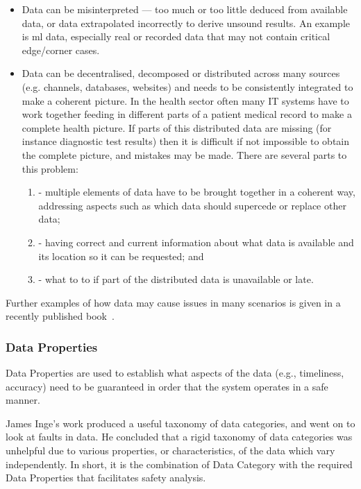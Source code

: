 \begin{itemize}
  \item {} Data can be misinterpreted --- too much or too little deduced from available data, or data extrapolated incorrectly to derive unsound results.
    An example is \gls{ml} data, especially real or recorded data that may not contain critical edge/corner cases.

  \item {}
    Data can be decentralised, decomposed or distributed across many sources (e.g. channels, \glspl{database}, websites) and needs to be consistently integrated to make a coherent picture. In the health sector often many IT systems have to work together feeding in different parts of a patient medical record to make a complete health picture. If parts of this distributed data are missing (for instance diagnostic test results) then it is difficult if not impossible to obtain the complete picture, and mistakes may be made.
    There are several parts to this problem:
    \begin{enumerate}[label=\alph*]
    	\item {} - multiple elements of data have to be brought together in a coherent way, addressing aspects such as which data should supercede or replace other data;
    	\item {} - having correct and current information about what data is available and its location so it can be requested; and
    	\item {} - what to to if part of the distributed data is unavailable or late.
    \end{enumerate}
\end{itemize}


Further examples of how data may cause issues in many scenarios is given in a recently published book~\cite{citation:datacentric}.

\subsubsection{Data Properties}\label{bkm:guidance:dataproperties}
Data Properties are used to establish what aspects of the data (e.g., timeliness, \gls{accuracy}) need to be guaranteed in order that the system operates in a safe manner.

James Inge's work \cite{citation:inge2008improving} produced a useful taxonomy of data categories, and went on to look at faults in data. He concluded that a rigid taxonomy of data categories was unhelpful due to various properties, or characteristics, of the data which vary independently. In short, it is the combination of Data Category with the required Data Properties that facilitates safety analysis.

